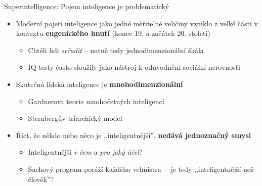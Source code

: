 
\begin{frame}{Superintelligence: Pojem inteligence je problematický}

    \begin{itemize}

        \item<1-> Moderní pojetí inteligence jako jedné měřitelné veličiny vzniklo
            z velké části v kontextu \textbf{eugenického hnutí} (konec 19. a začátek 20. století)

            \begin{itemize}

                \item<2-> Chtěli lidi \emph{seřadit} -- nutně tedy jednodimenzionální škála

                \item<3-> IQ testy často sloužily jako nástroj k odůvodnění sociální nerovnosti

            \end{itemize}

        \item<4-> Skutečná lidská inteligence je \textbf{mnohodimenzionální}

            \begin{itemize}

                \item<5-> Gardnerova teorie mnohočetných inteligencí \\

                \item<6-> Sternbergův triarchický model \\

            \end{itemize}

        \item<7-> Říct, že někdo nebo něco je ,,inteligentnější'', \textbf{nedává
            jednoznačný smysl}

            \begin{itemize}

                \item<8-> Inteligentnější \emph{v čem} a \emph{pro jaký účel}?

                \item<9-> Šachový program poráží každého velmistra~-- je tedy ,,inteligentnější než člověk''?

            \end{itemize}

    \end{itemize}

\end{frame}


